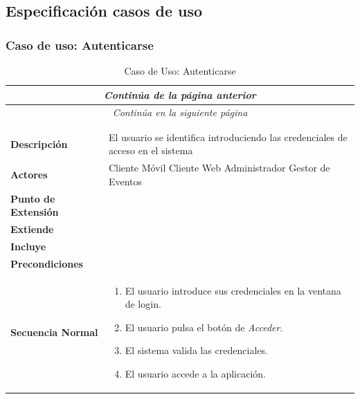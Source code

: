 \newpage
\subsection{Especificación casos de uso}


\newpage
\subsubsection*{Caso de uso: Autenticarse}
\begin{longtable}{| p{4cm} | p{10cm} |}
\endfirsthead
\multicolumn{2}{c}{\textit{Continúa de la página anterior}}\\[12pt]
\hline
\endhead
\hline
\multicolumn{2}{c}{\textit{Continúa en la siguiente página}} \\
\endfoot
\hline
\caption{Caso de Uso: Autenticarse}\label{fig:1}\\
\endlastfoot


\hline
\multicolumn{2}{|c|}{\textbf{CU$<$01$>$ - Autenticarse}} \\

\hline
\textbf{Descripción} &
El usuario se identifica introduciendo las credenciales de acceso en el sistema \\

\hline
\textbf{Actores} &
Cliente Móvil\newline
Cliente Web\newline
Administrador\newline
Gestor de Eventos\\

\hline
\textbf{Punto de Extensión} &
\\

\hline
\textbf{Extiende} &
\\

\hline
\textbf{Incluye} &
\\

\hline
\textbf{Precondiciones} &
\\

\hline
\textbf{Secuencia Normal} &\mbox{}\par\vspace{-\baselineskip}
\begin{enumerate}[leftmargin=0.7cm, topsep=0.1cm]
\item El usuario introduce sus credenciales en la ventana de login. 
\item El usuario pulsa el botón de \textit{Acceder}.
\item El sistema valida las credenciales.
\item El usuario accede a la aplicación.
\end{enumerate}\\


\end{longtable}
